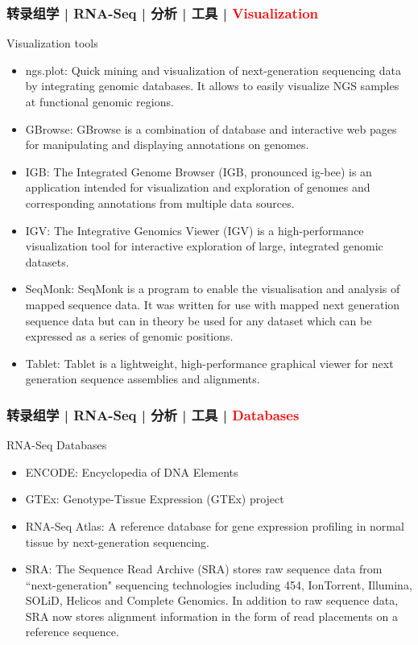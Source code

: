 \begin{frame}
  \frametitle{转录组学 | RNA-Seq | 分析 | 工具 | \textcolor{red}{Visualization}}
  {\footnotesize
  \begin{block}{Visualization tools}
    \begin{itemize}
      \item ngs.plot: Quick mining and visualization of next-generation sequencing data by integrating genomic databases. It allows to easily visualize NGS samples at functional genomic regions.
      \item GBrowse: GBrowse is a combination of database and interactive web pages for manipulating and displaying annotations on genomes.
      \item IGB: The Integrated Genome Browser (IGB, pronounced ig-bee) is an application intended for visualization and exploration of genomes and corresponding annotations from multiple data sources. 
      \item IGV: The Integrative Genomics Viewer (IGV) is a high-performance visualization tool for interactive exploration of large, integrated genomic datasets.
      \item SeqMonk: SeqMonk is a program to enable the visualisation and analysis of mapped sequence data. It was written for use with mapped next generation sequence data but can in theory be used for any dataset which can be expressed as a series of genomic positions.
      \item Tablet: Tablet is a lightweight, high-performance graphical viewer for next generation sequence assemblies and alignments.
    \end{itemize}
  \end{block}
  }
\end{frame}

\begin{frame}
  \frametitle{转录组学 | RNA-Seq | 分析 | 工具 | \textcolor{red}{Databases}}
  \begin{block}{RNA-Seq Databases}
    \begin{itemize}
      \item ENCODE: Encyclopedia of DNA Elements
      \item GTEx: Genotype-Tissue Expression (GTEx) project
      \item RNA-Seq Atlas: A reference database for gene expression profiling in normal tissue by next-generation sequencing.
      \item SRA: The Sequence Read Archive (SRA) stores raw sequence data from ``next-generation" sequencing technologies including 454, IonTorrent, Illumina, SOLiD, Helicos and Complete Genomics. In addition to raw sequence data, SRA now stores alignment information in the form of read placements on a reference sequence.
    \end{itemize}
  \end{block}
\end{frame}

